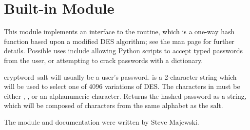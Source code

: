 \section{Built-in Module }
\label{module-crypt}

This module implements an interface to the  routine,
which is a one-way hash function based upon a modified DES algorithm;
see the \UNIX{} man page for further details.  Possible uses include
allowing Python scripts to accept typed passwords from the user, or
attempting to crack \UNIX{} passwords with a dictionary.

\begin{funcdesc}{crypt}{word\, salt} 
 will usually be a user's password.   is a
2-character string which will be used to select one of 4096 variations
of DES.  The characters in  must be
either , \code{/}, or an alphanumeric character.  Returns the
hashed password as a string, which will be composed of characters from
the same alphabet as the salt.
\end{funcdesc}

The module and documentation were written by Steve Majewski.
